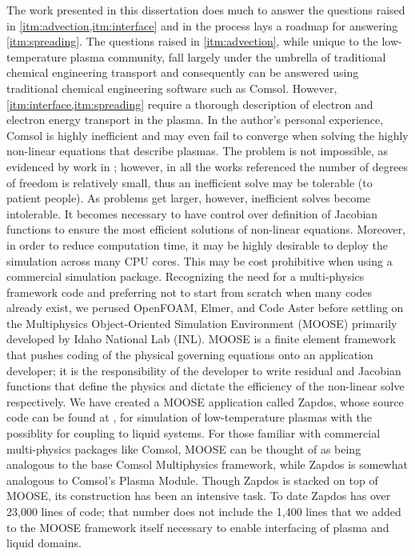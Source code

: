 The work presented in this dissertation does much to answer the questions raised in \cref{itm:advection,itm:interface} and in the process lays a roadmap for answering \cref{itm:spreading}. The questions raised in \cref{itm:advection}, while unique to the low-temperature plasma community, fall largely under the umbrella of traditional chemical engineering transport and consequently can be answered using traditional chemical engineering software such as Comsol. \cite{comsolSite} However, \cref{itm:interface,itm:spreading} require a thorough description of electron and electron energy transport in the plasma. In the author's personal experience, Comsol is highly inefficient and may even fail to converge when solving the highly non-linear equations that describe plasmas. The problem is not impossible, as evidenced by work in \cite{shirafuji2014numerical,sakiyama2007nonthermal,sakiyama2006finite}; however, in all the works referenced the number of degrees of freedom is relatively small, thus an inefficient solve may be tolerable (to patient people). As problems get larger, however, inefficient solves become intolerable. It becomes necessary to have control over definition of Jacobian functions to ensure the most efficient solutions of non-linear equations. Moreover, in order to reduce computation time, it may be highly desirable to deploy the simulation across many CPU cores. This may be cost prohibitive when using a commercial simulation package. Recognizing the need for a multi-physics framework code and preferring not to start from scratch when many codes already exist, we perused OpenFOAM\cite{foamSite}, Elmer\cite{elmerSite}, and Code Aster\cite{asterSite} before settling on the Multiphysics Object-Oriented Simulation Environment (MOOSE) primarily developed by Idaho National Lab (INL).\cite{mooseSite} MOOSE is a finite element framework that pushes coding of the physical governing equations onto an application developer; it is the responsibility of the developer to write residual and Jacobian functions that define the physics and dictate the efficiency of the non-linear solve respectively. We have created a MOOSE application called Zapdos, whose source code can be found at \cite{zapdosSite}, for simulation of low-temperature plasmas with the possiblity for coupling to liquid systems. For those familiar with commercial multi-physics packages like Comsol, MOOSE can be thought of as being analogous to the base Comsol Multiphysics framework, while Zapdos is somewhat analogous to Comsol's Plasma Module. Though Zapdos is stacked on top of MOOSE, its construction has been an intensive task. To date Zapdos has over 23,000 lines of code; that number does not include the 1,400 lines that we added to the MOOSE framework itself necessary to enable interfacing of plasma and liquid domains.

